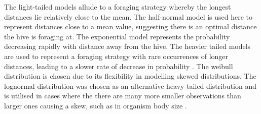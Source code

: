 \documentclass[11pt]{article}
\begin{document}
\begin{linenumbers}
The light-tailed models allude to a foraging strategy whereby the longest distances lie relatively close to the mean. The half-normal model is used here to represent distances close to a mean value, suggesting there is an optimal distance the hive is foraging at. The exponential model represents the probability decreasing rapidly with distance away from the hive. The heavier tailed models are used to represent a foraging strategy with rare occurrences of longer distances, leading to a slower rate of decrease in probability \citep{Reyna-Hurtado2012}. The weibull distribution is chosen due to its flexibility in modelling skewed distributions. The lognormal distribution was chosen as an alternative heavy-tailed distribution and is utilised in cases where the there are many more smaller observations than larger ones causing a skew, such as in organism body size \citep{Packard2014}.\par  

\end{linenumbers}
\end{document}
